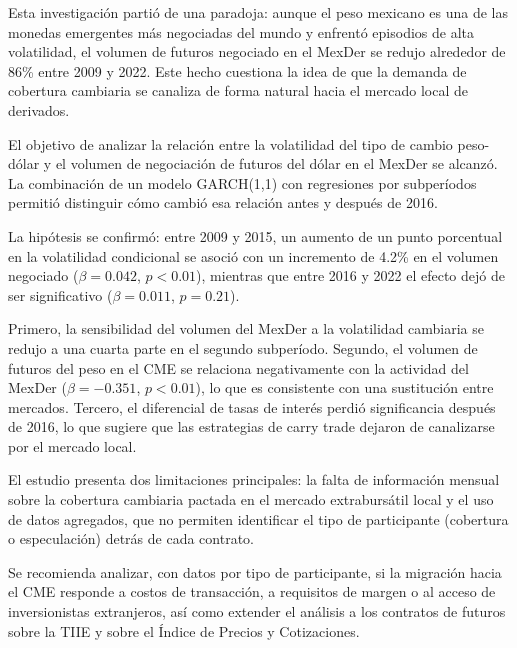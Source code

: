 

Esta investigación partió de una paradoja: aunque el peso mexicano es una de las monedas emergentes más negociadas del mundo y enfrentó episodios de alta volatilidad, el volumen de futuros negociado en el MexDer se redujo alrededor de 86\% entre 2009 y 2022. Este hecho cuestiona la idea de que la demanda de cobertura cambiaria se canaliza de forma natural hacia el mercado local de derivados.

El objetivo de analizar la relación entre la volatilidad del tipo de cambio peso-dólar y el volumen de negociación de futuros del dólar en el MexDer se alcanzó. La combinación de un modelo GARCH(1,1) con regresiones por subperíodos permitió distinguir cómo cambió esa relación antes y después de 2016.

La hipótesis se confirmó: entre 2009 y 2015, un aumento de un punto porcentual en la volatilidad condicional se asoció con un incremento de 4.2\% en el volumen negociado ($\beta = 0.042$, $p < 0.01$), mientras que entre 2016 y 2022 el efecto dejó de ser significativo ($\beta = 0.011$, $p = 0.21$).

Primero, la sensibilidad del volumen del MexDer a la volatilidad cambiaria se redujo a una cuarta parte en el segundo subperíodo. Segundo, el volumen de futuros del peso en el CME se relaciona negativamente con la actividad del MexDer ($\beta = -0.351$, $p < 0.01$), lo que es consistente con una sustitución entre mercados. Tercero, el diferencial de tasas de interés perdió significancia después de 2016, lo que sugiere que las estrategias de carry trade dejaron de canalizarse por el mercado local.

El estudio presenta dos limitaciones principales: la falta de información mensual sobre la cobertura cambiaria pactada en el mercado extrabursátil local y el uso de datos agregados, que no permiten identificar el tipo de participante (cobertura o especulación) detrás de cada contrato.

Se recomienda analizar, con datos por tipo de participante, si la migración hacia el CME responde a costos de transacción, a requisitos de margen o al acceso de inversionistas extranjeros, así como extender el análisis a los contratos de futuros sobre la TIIE y sobre el Índice de Precios y Cotizaciones.

